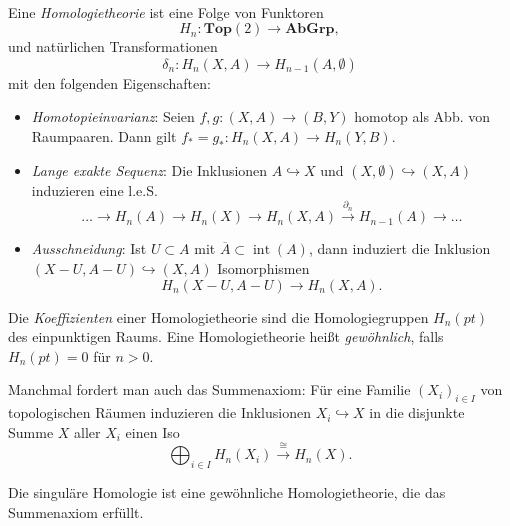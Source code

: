 \documentclass{cheat-sheet}
\newcommand{\Top}{\mathbf{Top}} %
\newcommand{\AbGrp}{\mathbf{AbGrp}} %
\DeclareMathOperator{\inte}{int} %
\newcommand{\clos}[1]{\overline{#1}} %
\begin{document}



\begin{defn}\mbox{}\\
  Eine \emph{Homologietheorie} ist eine Folge von Funktoren
  \[ H_n : \Top(2) \to \AbGrp, \]
  und natürlichen Transformationen
  \[ \delta_n : H_n(X, A) \to H_{n-1}(A, \emptyset) \]
  mit den folgenden Eigenschaften:
  \begin{itemize}
    \item \emph{Homotopieinvarianz}: Seien $f, g : (X, A) \to (B, Y)$ homotop als Abb. von Raumpaaren. Dann gilt $f_* \!=\! g_* : H_n(X, A) \to H_n(Y, B)$.
    \item \emph{Lange exakte Sequenz}: Die Inklusionen $A \hookrightarrow X$ und $(X, \emptyset) \hookrightarrow (X, A)$ induzieren eine l.e.S.
    \[ \ldots \to H_n(A) \to H_n(X) \to H_n(X, A) \xrightarrow{\partial_n} H_{n-1}(A) \to \ldots \]
    \item \emph{Ausschneidung}: Ist $U \subset A$ mit $\clos{A} \subset \inte(A)$, dann induziert die Inklusion $(X - U, A - U) \hookrightarrow (X, A)$ Isomorphismen
    \[ H_n(X-U, A-U) \to H_n(X,A). \]
  \end{itemize}
\end{defn}

\begin{defn}
  Die \emph{Koeffizienten} einer Homologietheorie sind die Homologiegruppen $H_n(pt)$ des einpunktigen Raums.
  Eine Homologietheorie heißt \emph{gewöhnlich}, falls $H_n(pt) = 0$ für $n > 0$.
\end{defn}

\begin{bem}
  Manchmal fordert man auch das Summenaxiom: Für eine Familie $(X_i)_{i \in I}$ von topologischen Räumen induzieren die Inklusionen $X_i \hookrightarrow X$ in die disjunkte Summe $X$ aller $X_i$ einen Iso
  \[ \bigoplus_{i \in I} H_n(X_i) \xrightarrow{\cong} H_n(X). \]
\end{bem}

\begin{bem}
  Die singuläre Homologie ist eine gewöhnliche Homologietheorie, die das Summenaxiom erfüllt.
\end{bem}

\end{document}
